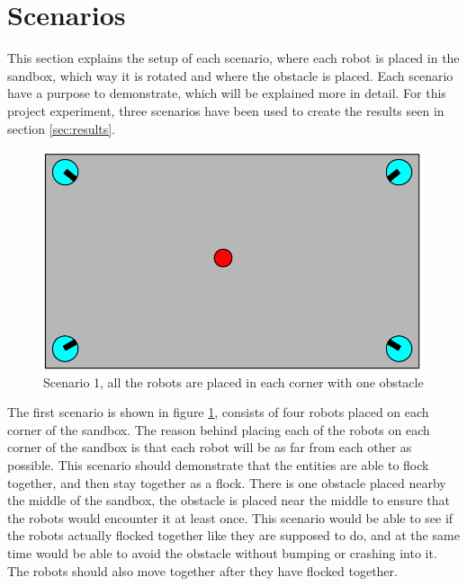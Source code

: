 \section{Scenarios}
This section explains the setup of each scenario, where each robot is placed in the sandbox, which way it is rotated and where the obstacle is placed. Each scenario have a purpose to demonstrate, which will be explained more in detail.
For this project experiment, three scenarios have been used to create the results seen in section \ref{sec:results}.
\label{sec:scenario}
\begin{figure}[h]
\begin{center}
\includegraphics[width=0.8\linewidth]{figs/scenario0}
\end{center}
\caption[scenario 1]{Scenario 1, all the robots are placed in each corner with one obstacle}
\label{fig:scenario0}
\end{figure}

The first scenario is shown in figure \ref{fig:scenario0}, consists of four robots placed on each corner of the sandbox. The reason behind placing each of the robots on each corner of the sandbox is that each robot will be as far from each other as possible. This scenario should demonstrate that the entities are able to flock together, and then stay together as a flock. There is one obstacle placed nearby the middle of the sandbox, the obstacle is placed near the middle to ensure that the robots would encounter it at least once. This scenario would be able to see if the robots actually flocked together like they are supposed to do, and at the same time would be able to avoid the obstacle without bumping or crashing into it. The robots should also move together after they have flocked together.

